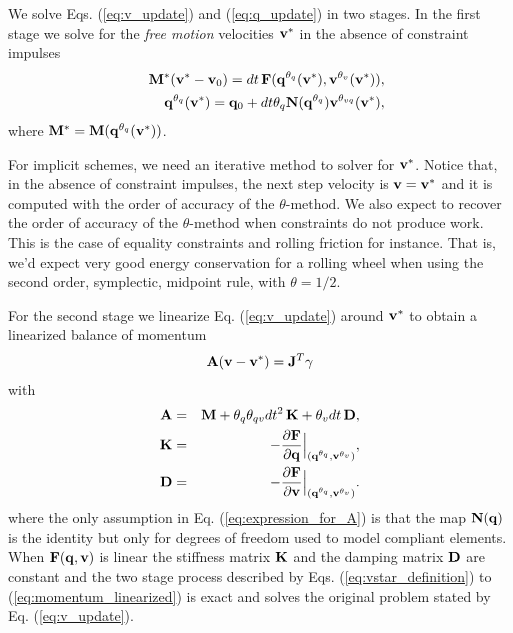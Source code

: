 We solve Eqs. (\ref{eq:v_update}) and (\ref{eq:q_update}) in two stages. In the
first stage we solve for the \textit{free motion} velocities ${\mathbf{v}}^*$ in the
absence of constraint impulses 
\begin{eqnarray}
	&&\mf{M}^*(\mf{v}^*-\mf{v}_0) = dt\,\mf{F}(\mf{q}^{\theta_q}(\mf{v}^*), \mf{v}^{\theta_v}(\mf{v}^*)),
	\label{eq:vstar_definition}\\
	&&\mf{q}^{\theta_q}(\mf{v}^*) = \mf{q}_0 + dt\theta_q\mf{N}(\mf{q}^{\theta_{q}})\mf{v}^{\theta_{vq}}(\mf{v}^*),
	\label{eq:qstar_definition}
\end{eqnarray}
where ${\mathbf{M}}^* = {\mathbf{M}}({\mathbf{q}}^{\theta_q}({\mathbf{v}}^*))$.

For implicit schemes, we need an iterative method to solver for ${\mathbf{v}}^*$.
Notice that, in the absence of constraint impulses, the next step velocity is
${\mathbf{v}}={\mathbf{v}}^*$ and it is computed with the order of accuracy of the
$\theta\text{-method}$. We also expect to recover the order of accuracy of the
$\theta\text{-method}$ when constraints do not produce work.
 This is the case of equality constraints and rolling friction for
instance. That is, we'd expect very good energy conservation for a rolling wheel
when using the second order, symplectic, midpoint rule, with $\theta=1/2$.

For the second stage we linearize Eq. (\ref{eq:v_update})
around ${\mathbf{v}}^*$ to obtain a linearized balance of momentum
\begin{eqnarray}
	\mf{A}(\mf{v}-\mf{v}^*)= \mf{J}^T\mf{\gamma}
	\label{eq:momentum_linearized}
\end{eqnarray}
with
\begin{eqnarray}
	\mf{A}&=&\mf{M}+\theta_q\theta_{qv} dt^2\,\mf{K}+\theta_v dt\,\mf{D},
	\label{eq:expression_for_A}\\
	\mf{K}&=&-\frac{\partial \mf{F}}{\partial \mf{q}}\Bigr|_{(\mf{q}^{\theta_q}, \mf{v}^{\theta_v})},\\
	\mf{D}&=&-\frac{\partial \mf{F}}{\partial \mf{v}}\Bigr|_{(\mf{q}^{\theta_q},
	\mf{v}^{\theta_v})}.
	\label{eq:dissipation_matrix}
\end{eqnarray}
where the only assumption in Eq. (\ref{eq:expression_for_A}) is that the map
${\mathbf{N}}({\mathbf{q}})$ is the identity but only for degrees of freedom used to model
compliant elements. When ${\mathbf{F}}({\mathbf{q}}, {\mathbf{v}})$ is linear the stiffness matrix
${\mathbf{K}}$ and the damping matrix ${\mathbf{D}}$ are constant and the two stage process
described by Eqs. (\ref{eq:vstar_definition}) to (\ref{eq:momentum_linearized})
is exact and solves the original problem stated by Eq. (\ref{eq:v_update}).

